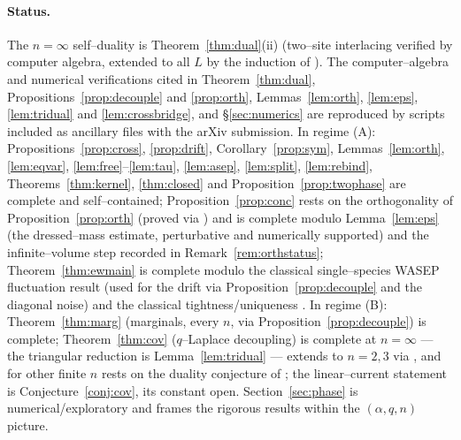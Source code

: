 \documentclass[11pt]{article}
\theoremstyle{plain}
\theoremstyle{definition}
\theoremstyle{remark}
\begin{document}
\paragraph{Status.} The $n=\infty$ self--duality is Theorem~\ref{thm:dual}(ii)
(two--site interlacing verified by computer algebra, extended to all $L$ by the
induction of \cite{REU}). The computer--algebra and numerical verifications cited in
Theorem~\ref{thm:dual}, Propositions~\ref{prop:decouple} and \ref{prop:orth},
Lemmas~\ref{lem:orth}, \ref{lem:eps}, \ref{lem:tridual} and \ref{lem:crossbridge}, and
\S\ref{sec:numerics} are reproduced by scripts included as ancillary files with the arXiv submission. In regime (A): Propositions~\ref{prop:cross},
\ref{prop:drift}, Corollary~\ref{prop:sym}, Lemmas~\ref{lem:orth}, \ref{lem:eqvar},
\ref{lem:free}--\ref{lem:tau}, \ref{lem:asep}, \ref{lem:split}, \ref{lem:rebind},
Theorems~\ref{thm:kernel}, \ref{thm:closed} and Proposition~\ref{prop:twophase} are
complete and self--contained; Proposition~\ref{prop:conc} rests on the orthogonality
of Proposition~\ref{prop:orth} (proved via \cite{CFG20}) and is complete modulo
Lemma~\ref{lem:eps} (the dressed--mass estimate, perturbative and numerically
supported) and the infinite--volume step recorded in Remark~\ref{rem:orthstatus}; Theorem~\ref{thm:ewmain} is complete modulo the classical
single--species WASEP fluctuation result (used for the drift via
Proposition~\ref{prop:decouple} and the diagonal noise) and the classical
tightness/uniqueness \cite{KL}. In regime
(B): Theorem~\ref{thm:marg} (marginals, every $n$, via
Proposition~\ref{prop:decouple}) is complete; Theorem~\ref{thm:cov} ($q$--Laplace
decoupling) is complete at $n=\infty$ --- the triangular reduction is
Lemma~\ref{lem:tridual} --- extends to $n=2,3$ via \cite{REU}, and for other finite
$n$ rests on the duality conjecture of \cite[Rmk.~4]{REU}; the linear--current
statement is Conjecture~\ref{conj:cov}, its constant open. Section~\ref{sec:phase} is numerical/exploratory and frames the rigorous
results within the $(\alpha,q,n)$ picture.
\end{document}
